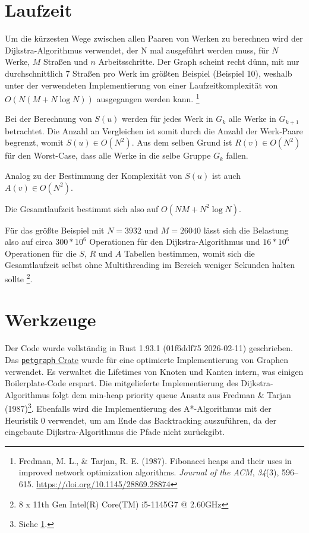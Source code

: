 \documentclass[a4paper,10pt,ngerman]{scrartcl}
\begin{document}
    \section{Laufzeit}\label{sec:laufzeit}
    Um die kürzesten Wege zwischen allen Paaren von Werken zu berechnen wird der Dijkstra-Algorithmus verwendet, der
    N mal ausgeführt werden muss, für $N$ Werke, $M$ Straßen und $n$ Arbeitsschritte. Der Graph scheint recht dünn, mit
    nur durchschnittlich 7 Straßen pro Werk im größten Beispiel (Beispiel 10), weshalb unter der verwendeten
    Implementierung von einer Laufzeitkomplexität von $O(N(M + N \log N))$ ausgegangen werden kann.
    \footnote{\label{fn:dijkstra}Fredman, M. L., \& Tarjan, R. E. (1987).
    Fibonacci heaps and their uses in improved network optimization algorithms.
    \textit{Journal of the ACM}, \textit{34}(3), 596–615. \url{https://doi.org/10.1145/28869.28874}}

    Bei der Berechnung von $S(u)$ werden für jedes Werk in $G_k$ alle Werke in $G_{k+1}$ betrachtet. Die Anzahl an
    Vergleichen ist somit durch die Anzahl der Werk-Paare begrenzt, womit $S(u) \in O(N^2)$.
    Aus dem selben Grund ist $R(v) \in O(N^2)$ für den Worst-Case, dass alle Werke in die selbe Gruppe $G_k$ fallen.

    Analog zu der Bestimmung der Komplexität von $S(u)$ ist auch $A(v) \in O(N^2)$.

    Die Gesamtlaufzeit bestimmt sich also auf $O(NM + N^2 \log N)$.

    Für das größte Beispiel mit $N = 3932$ und $M = 26040$ lässt sich die Belastung also auf circa $300 * 10^6$
    Operationen für den Dijkstra-Algorithmus und $16 * 10^6$ Operationen für die $S$, $R$ und $A$ Tabellen bestimmen,
    womit sich die Gesamtlaufzeit selbst ohne Multithreading im Bereich weniger Sekunden halten sollte
    \footnote{8 x 11th Gen Intel(R) Core(TM) i5-1145G7 @ 2.60GHz}.


    \section{Werkzeuge}
    Der Code wurde vollständig in Rust 1.93.1 (01f6ddf75 2026-02-11) geschrieben.\\
    Das \href{https://crates.io/crates/petgraph}{\texttt{petgraph} Crate}
    wurde für eine optimierte Implementierung von Graphen verwendet. Es verwaltet die Lifetimes von Knoten und Kanten
    intern, was einigen Boilerplate-Code erspart. Die mitgelieferte Implementierung des Dijkstra-Algorithmus folgt dem
    min-heap priority queue Ansatz aus Fredman \& Tarjan (1987)\footnote{Siehe \cref{fn:dijkstra}.}. Ebenfalls wird die
    Implementierung des A*-Algorithmus mit der Heuristik $0$ verwendet, um am Ende das Backtracking auszuführen, da der
    eingebaute Dijkstra-Algorithmus die Pfade nicht zurückgibt.\\
\end{document}
